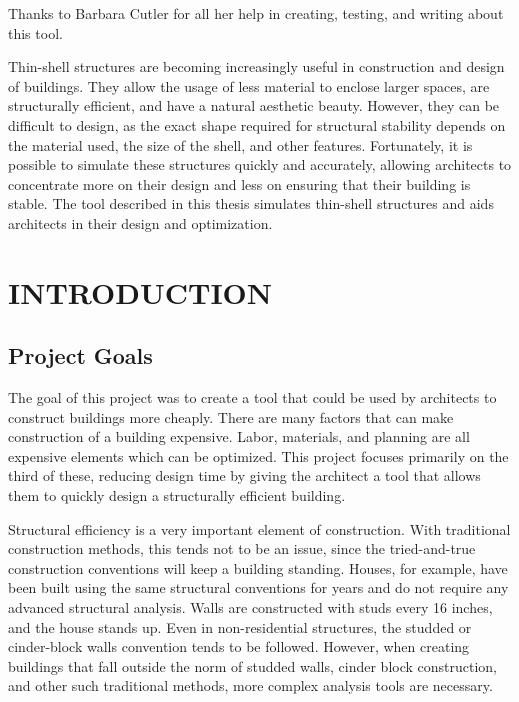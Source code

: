 \documentclass{thesis}
\author{R. Allan Pendergrast}
\begin{document}
 
\titlepage             %
\tableofcontents       %
\listoftables          %
\listoffigures         %

Thanks to Barbara Cutler for all her help in creating, testing, and writing about this tool.

Thin-shell structures are becoming increasingly useful in construction and design of buildings.  They allow the usage of less material to enclose
larger spaces, are structurally efficient, and have a natural aesthetic beauty.  However, they can be difficult to design, as the exact shape
required for structural stability depends on the material used, the size of the shell, and other features.  Fortunately, it is possible to simulate
these structures quickly and accurately, allowing architects to concentrate more on their design and less on ensuring that their building is
stable.  The tool described in this thesis simulates thin-shell structures and aids architects in their design and optimization.

\chapter{INTRODUCTION} \label{chp:introduction}

\section{Project Goals} \label{sec:goals}
The goal of this project was to create a tool that could be used by architects to construct buildings more cheaply.  There are many factors
that can make construction of a building expensive.  Labor, materials, and planning are all expensive elements which can be optimized.
This project focuses primarily on the third of these, reducing design time by giving the architect a tool that allows them to quickly design a
structurally efficient building.

Structural efficiency is a very important element of construction.  With traditional construction methods, this tends not to be an issue, since
the tried-and-true construction conventions will keep a building standing.  Houses, for example, have been built using the same structural
conventions for years and do not require any advanced structural analysis.  Walls are constructed with studs every 16 inches, and the house
stands up.  Even in non-residential structures, the studded or cinder-block walls convention tends to be followed.  However, when creating
buildings that fall outside the norm of studded walls, cinder block construction, and other such traditional methods, more complex analysis
tools are necessary.  
\end{document}
